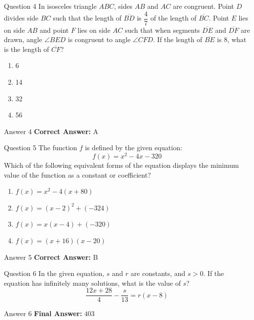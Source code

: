 \documentclass{beamer}
\begin{document}
\begin{frame}{Question 4}
\small
In isosceles triangle $ABC$, sides $AB$ and $AC$ are congruent. Point $D$ divides side $BC$ such that the length of $\overline{BD}$ is $\dfrac{4}{7}$ of the length of $\overline{BC}$. Point $E$ lies on side $AB$ and point $F$ lies on side $AC$ such that when segments $\overline{DE}$ and $\overline{DF}$ are drawn, angle $\angle BED$ is congruent to angle $\angle CFD$. If the length of $\overline{BE}$ is $8$, what is the length of $\overline{CF}$?
\vspace{0.35cm}
\begin{enumerate}
    \item[A.] 6
    \item[B.] 14
    \item[C.] 32
    \item[D.] 56
\end{enumerate}
\end{frame}
\begin{frame}{Answer 4}
\small
\textbf{Correct Answer:} A
\end{frame}

\begin{frame}{Question 5}
\small
The function $f$ is defined by the given equation: 
\[
f(x) = x^2 - 4x - 320
\]
Which of the following equivalent forms of the equation displays the minimum value of the function as a constant or coefficient?
\vspace{0.35cm}
\begin{enumerate}
    \item[A.] $f(x) = x^2 - 4(x + 80)$
    \item[B.] $f(x) = (x - 2)^2 + (-324)$
    \item[C.] $f(x) = x(x - 4) + (-320)$
    \item[D.] $f(x) = (x + 16)(x - 20)$
\end{enumerate}
\end{frame}
\begin{frame}{Answer 5}
\small
\textbf{Correct Answer:} B
\end{frame}

\begin{frame}{Question 6}
\small
In the given equation, $s$ and $r$ are constants, and $s > 0$. If the equation has infinitely many solutions, what is the value of $s$?
\[
\frac{12x + 28}{4} - \frac{s}{13} = r(x - 8)
\]
\end{frame}
\begin{frame}{Answer 6}
\small
\textbf{Final Answer:} $\boxed{403}$
\end{frame}
\end{document}
